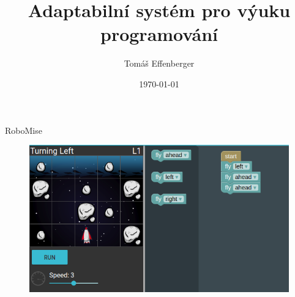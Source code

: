 \documentclass[
]{beamer}
\begin{document}
\title{Adaptabilní systém pro výuku programování}
\author[T.\,Effenberger]{Tomáš Effenberger} %
\date{\today}

\begin{frame}[plain]
\maketitle
\end{frame}



\begin{frame}{RoboMise}
\begin{figure}
\includegraphics[width=\textwidth,height=.65\textheight,keepaspectratio]{../img/robomission-task1}
\end{figure}
\end{frame}
\end{document}
